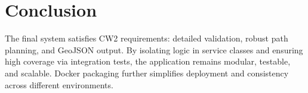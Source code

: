 \documentclass[12pt]{article}
\begin{document}
\section{Conclusion}
The final system satisfies CW2 requirements: detailed validation, robust path planning, and 
GeoJSON output. By isolating logic in service classes and ensuring high coverage via 
integration tests, the application remains modular, testable, and scalable. Docker 
packaging further simplifies deployment and consistency across different environments.
\end{document}
